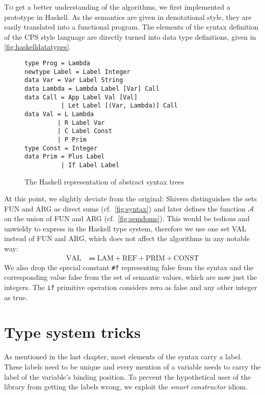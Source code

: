 \documentclass[a4paper,parskip=half,BCOR=8mm,DIV=calc,12pt]{scrbook}
\newcommand{\A}{\mathcal A}
\begin{document}
\lettrine T{o} get a better understanding of the algorithms, we first implemented a prototype in Haskell. As the semantics are given in denotational style, they are easily translated into a functional program. The elements of the syntax definition of the CPS style language are directly turned into data type definitions, given in \vref{fig:haskelldatatypes}.

\begin{figure}
\begin{framed}
\begin{lstlisting}
type Prog = Lambda
newtype Label = Label Integer
data Var = Var Label String
data Lambda = Lambda Label [Var] Call
data Call = App Label Val [Val]
          | Let Label [(Var, Lambda)] Call
data Val = L Lambda
         | R Label Var
         | C Label Const
         | P Prim
type Const = Integer
data Prim = Plus Label
          | If Label Label 
\end{lstlisting}
\end{framed}
\caption{The Haskell representation of abstract syntax trees}
\label{fig:haskelldatatypes}
\end{figure}


At this point, we slightly deviate from the original: Shivers distinguishes the sets FUN and ARG as direct sums (cf.\ \vref{fig:syntax}) and later defines the function $\A$ on the union of FUN and ARG (cf.\ \vref{fig:semdoms}). This would be tedious and unwieldy to express in the Haskell type system, therefore we use one set VAL instead of FUN and ARG, which does not affect the algorithms in any notable way:
\begin{align*}
\text{VAL} &\Coloneqq \text{LAM} + \text{REF} + \text{PRIM} + \text{CONST}
\end{align*}
We also drop the special constant \texttt{\#f} representing false from the syntax and the corresponding value false from the set of semantic values, which are now just the integers. The \texttt{if} primitive operation considers zero as false and any other integer as true.

\section{Type system tricks}

As mentioned in the last chapter, most elements of the syntax carry a label. These labels need to be unique and every mention of a variable needs to carry the label of the variable’s binding position. To prevent the hypothetical user of the library from getting the labels wrong, we exploit the \textit{smart constructor} idiom.
\end{document}
